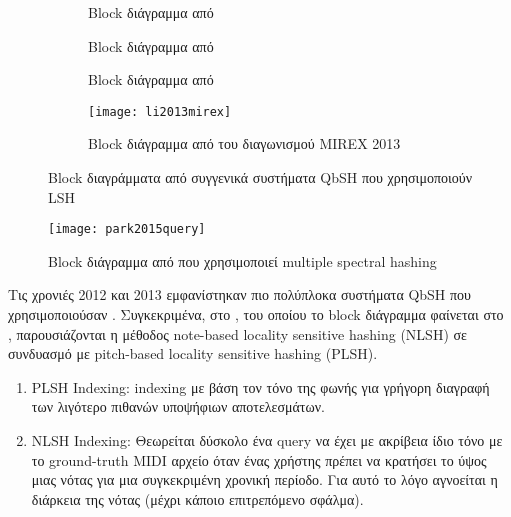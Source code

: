 \begin{figure}[htb]
	\centering
	\begin{subfigure}[t]{0.3\linewidth}
		\caption{Block διάγραμμα από \protect\cite{wang2012query}}
		\label{fig:wang2012query}
	\end{subfigure}\hfill
	\begin{subfigure}[t]{0.3\linewidth}
		\caption{Block διάγραμμα από \protect\cite{guo2012query}}
		\label{fig:guo2012query}
	\end{subfigure}\hfill
	\begin{subfigure}[t]{0.3\linewidth}
		\caption{Block διάγραμμα από \protect\cite{guo2013query}}
		\label{fig:guo2013query}
	\end{subfigure}
	\begin{subfigure}[t]{0.63\linewidth}
		\texttt{[image: li2013mirex]}
		\caption{Block διάγραμμα από \protect\cite{li2013mirex} του διαγωνισμού MIREX 2013}
		\label{fig:li2013mirex}
	\end{subfigure}
	\caption{Block διαγράμματα από συγγενικά συστήματα QbSH που χρησιμοποιούν LSH}
	\label{fig:many-lsb-blocks}
\end{figure}

\begin{figure}
	\centering
	\texttt{[image: park2015query]}
	\caption{Block διάγραμμα από \protect\cite{park2015query} που χρησιμοποιεί multiple spectral hashing}
	\label{fig:park2015query}
\end{figure}

Τις χρονιές 2012 και 2013 εμφανίστηκαν πιο πολύπλοκα συστήματα QbSH που χρησιμοποιούσαν \lsh{}.
Συγκεκριμένα, στο \cite{wang2012query}, του οποίου το block διάγραμμα φαίνεται στο ,
παρουσιάζονται η μέθοδος note-based locality sensitive hashing (NLSH)
σε συνδυασμό με pitch-based locality sensitive hashing (PLSH).
\begin{enumerate}
	\item PLSH Indexing:
	      indexing με βάση τον τόνο της φωνής για γρήγορη διαγραφή των λιγότερο πιθανών υποψήφιων αποτελεσμάτων.
	\item NLSH Indexing:
	      Θεωρείται δύσκολο ένα query να έχει με ακρίβεια ίδιο τόνο με το ground-truth MIDI αρχείο όταν ένας χρήστης πρέπει να κρατήσει το ύψος μιας νότας για μια συγκεκριμένη χρονική περίοδο.
	      Για αυτό το λόγο αγνοείται η διάρκεια της νότας (μέχρι κάποιο επιτρεπόμενο σφάλμα).
\end{enumerate}

